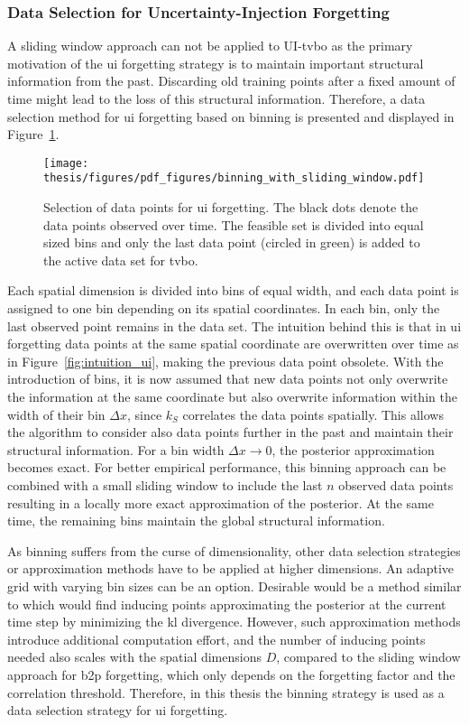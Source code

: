 \subsubsection{Data Selection for Uncertainty-Injection Forgetting }

A sliding window approach can not be applied to UI-\gls{tvbo} as the primary motivation of the \gls{ui} forgetting strategy is to maintain important structural information from the past. Discarding old training points after a fixed amount of time might lead to the loss of this structural information. Therefore, a data selection method for \gls{ui} forgetting based on binning is presented and displayed in Figure~\ref{fig:binning}. 
\begin{figure}[h]
   \centering
   \texttt{[image: thesis/figures/pdf\_figures/binning\_with\_sliding\_window.pdf]}
 \caption[Visualization of binning as a data selection strategy for \gls{ui} forgetting.]{Selection of data points for \gls{ui} forgetting. The black dots denote the data points observed over time. The feasible set is divided into equal sized bins and only the last data point (circled in green) is added to the active data set for \gls{tvbo}.}
 \label{fig:binning}
\end{figure}
Each spatial dimension is divided into bins of equal width, and each data point is assigned to one bin depending on its spatial coordinates. In each bin, only the last observed point remains in the data set. The intuition behind this is that in \gls{ui} forgetting data points at the same spatial coordinate are overwritten over time as in Figure~\ref{fig:intuition_ui}, making the previous data point obsolete. With the introduction of bins, it is now assumed that new data points not only overwrite the information at the same coordinate but also overwrite information within the width of their bin $\Delta x$, since $k_S$ correlates the data points spatially. This allows the algorithm to consider also data points further in the past and maintain their structural information. For a bin width $\Delta x \to 0$, the posterior approximation becomes exact. For better empirical performance, this binning approach can be combined with a small sliding window to include the last $n$ observed data points resulting in a locally more exact approximation of the posterior. At the same time, the remaining bins maintain the global structural information.

As binning suffers from the curse of dimensionality, other data selection strategies or approximation methods have to be applied at higher dimensions. An adaptive grid with varying bin sizes can be an option. Desirable would be a method similar to \textcite{Titsias_2009} which would find inducing points approximating the posterior at the current time step by minimizing the \gls{kl} divergence. However, such approximation methods introduce additional computation effort, and the number of inducing points needed also scales with the spatial dimensions $D$, compared to the sliding window approach for \gls{b2p} forgetting, which only depends on the forgetting factor and the correlation threshold. Therefore, in this thesis the binning strategy is used as a data selection strategy for \gls{ui} forgetting.


